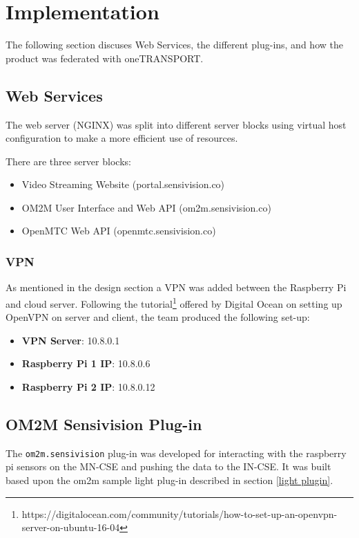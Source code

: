 \chapter{Implementation}

The following section discuses Web Services, the different plug-ins, and how the product was federated with oneTRANSPORT.

\section{Web Services}
\label{sec:web-services}

The web server (NGINX) was split into different server blocks using virtual host configuration to make a more efficient use of resources. 

There are three server blocks:

\begin{itemize}
  \item Video Streaming Website (portal.sensivision.co)
  \item OM2M User Interface and Web API (om2m.sensivision.co)
  \item OpenMTC Web API (openmtc.sensivision.co)
\end{itemize}

\subsection{VPN}

As mentioned in the design section a VPN was added between the Raspberry Pi and cloud server. Following the tutorial\footnote{https://digitalocean.com/community/tutorials/how-to-set-up-an-openvpn-server-on-ubuntu-16-04} offered by Digital Ocean on setting up OpenVPN on server and client, the team produced the following set-up:

\begin{itemize}
\item \textbf{VPN Server}: 10.8.0.1
\item \textbf{Raspberry Pi 1 IP}: 10.8.0.6
\item \textbf{Raspberry Pi 2 IP}: 10.8.0.12
\end{itemize}

\section{OM2M Sensivision Plug-in}

The \lstinline{om2m.sensivision} plug-in was developed for interacting with the raspberry pi sensors on the MN-CSE and pushing the data to the IN-CSE. It was built based upon the om2m sample light plug-in described in section \ref{light plugin}.

